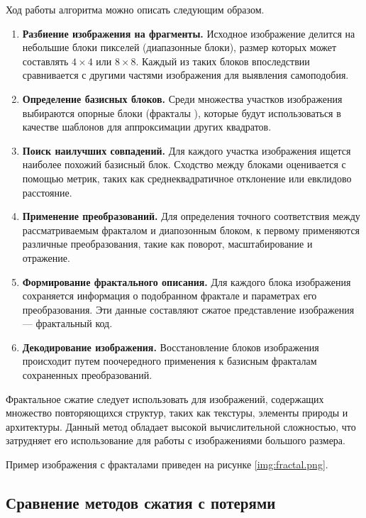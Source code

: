 Ход работы алгоритма можно описать следующим образом.
\begin{enumerate}
    \item \textbf{Разбиение изображения на фрагменты.} Исходное изображение делится на небольшие блоки пикселей (диапазонные блоки), размер которых может составлять $4 \times 4$ или $8 \times 8$. Каждый из таких блоков впоследствии сравнивается с другими частями изображения для выявления самоподобия.
    \item \textbf{Определение базисных блоков.} Среди множества участков изображения выбираются опорные блоки (фракталы \cite{Fractal}), которые будут использоваться в качестве шаблонов для аппроксимации других квадратов.
    \item \textbf{Поиск наилучших совпадений.} Для каждого участка изображения ищется наиболее похожий базисный блок. Сходство между блоками оценивается с помощью метрик, таких как среднеквадратичное отклонение или евклидово расстояние.
    \item \textbf{Применение преобразований.} Для определения точного соответствия между рассматриваемым фракталом и диапозонным блоком, к первому применяются различные преобразования, такие как поворот, масштабирование и отражение. 
    \item \textbf{Формирование фрактального описания.} Для каждого блока изображения сохраняется информация о подобранном фрактале и параметрах его преобразования. Эти данные составляют сжатое представление изображения --- фрактальный код.
    \item \textbf{Декодирование изображения.} Восстановление блоков изображения происходит путем поочередного применения к базисным фракталам сохраненных преобразований.
\end{enumerate}

Фрактальное сжатие следует использовать для изображений, содержащих множество повторяющихся структур, таких как текстуры, элементы природы и архитектуры. Данный метод обладает высокой вычислительной сложностью, что затрудняет его использование для работы с изображениями большого размера.

Пример изображения с фракталами приведен на рисунке \ref{img:fractal.png}.

\subsection{Сравнение методов сжатия с потерями}

